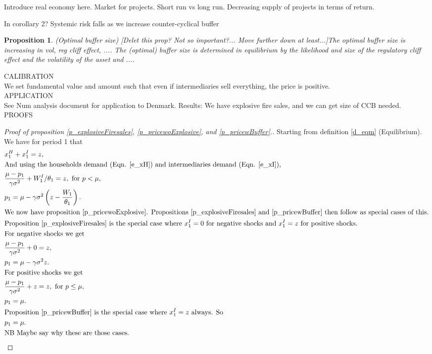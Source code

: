\documentclass[11pt]{article}
\newtheorem{proposition}{Proposition}
\begin{document}
Introduce real economy here. Market for projects. Short run vs long run. Decreasing supply of projects in terms of return.

In corollary 2? Systemic risk falls as we increase counter-cyclical buffer

\begin{proposition} (Optimal buffer size)
[Delet this prop? Not so important?... Move further down at least...]The optimal buffer size is increasing in vol, reg cliff effect, ....
The (optimal) buffer size is determined in equilibrium by the likelihood and size of the regulatory cliff effect and the volatility of the asset and .... 
\end{proposition}


CALIBRATION\\
We set fundamental value and amount such that even if intermediaries sell everything, the price is positive.\\


APPLICATION\\
See Num analysis document for application to Denmark. Results: We have explosive fire sales, and we can get size of CCB needed.\\



PROOFS
\begin{proof}[Proof of proposition \ref{p_explosiveFiresales}, \ref{p_pricewoExplosive}, and \ref{p_pricewBuffer}.]
Starting from definition \ref{d_eqm} (Equilibrium). We have for period 1 that
\begin{align*}
&x^H_1 + x^I_1 = z,\\
&\text{And using the households demand (Eqn. \ref{e_xH}) and intermediaries demand (Eqn. \ref{e_xI}),}\\
&\frac{\mu - p_1}{\gamma\sigma^2} + W^I_1/\theta_1 = z, \text{ for $p<\mu$},\\
&p_1 = \mu - \gamma \sigma^2 \left(z - \frac{W_1}{\theta_1}\right).\\
&\text{We now have proposition \ref{p_pricewoExplosive}. Propositions \ref{p_explosiveFiresales} and \ref{p_pricewBuffer} then follow as special cases of this.}\\
&\text{Proposition \ref{p_explosiveFiresales} is the special case where $x^I_1 = 0$ for negative shocks and $x^I_1 = z$ for positive shocks.}\\
&\text{For negative shocks we get}\\
&\frac{\mu - p_1}{\gamma\sigma^2} + 0 = z,\\
&p_1 = \mu - \gamma\sigma^2 z.\\
&\text{For positive shocks we get}\\
&\frac{\mu - p_1}{\gamma\sigma^2} + z = z, \text{ for $p\leq\mu$},\\
&p_1 = \mu.\\
&\text{Proposition \ref{p_pricewBuffer} is the special case where $x^I_1 = z$ always. So}\\
&p_1 = \mu.\\
&\text{NB Maybe say why these are those cases.}\\
\end{align*}
\end{proof}
\end{document}
